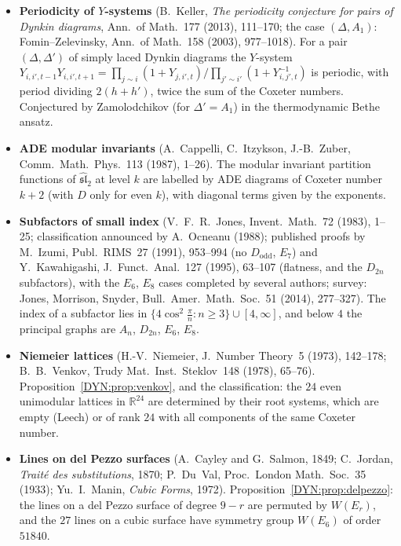 \documentclass[11pt,openany]{book}
\theoremstyle{plain}
\theoremstyle{definition}
\theoremstyle{remark}
\newcommand{\R}{\mathbb{R}}
\begin{document}
\begin{itemize}[leftmargin=1.2em,itemsep=0.45em]
  by the Cartan matrices of finite type; the cluster complex is the dual of a generalized associahedron.
\item \textbf{Periodicity of $Y$-systems} (B.~Keller, \emph{The periodicity conjecture for pairs of Dynkin
  diagrams}, Ann.\ of Math.~177 (2013), 111--170; the case $(\Delta,A_1)$: Fomin--Zelevinsky, Ann.\ of
  Math.~158 (2003), 977--1018). For a pair $(\Delta,\Delta')$ of simply laced Dynkin diagrams the
  $Y$-system
  $Y_{i,i',t-1}Y_{i,i',t+1}=\prod_{j\sim i}(1+Y_{j,i',t})\big/\prod_{j'\sim i'}(1+Y_{i,j',t}^{-1})$ is periodic,
  with period dividing $2(h+h')$, twice the sum of the Coxeter numbers. Conjectured by Zamolodchikov
  (for $\Delta'=A_1$) in the thermodynamic Bethe ansatz.
\item \textbf{ADE modular invariants} (A.~Cappelli, C.~Itzykson, J.-B.~Zuber, Comm.\ Math.\ Phys.~113
  (1987), 1--26). The modular invariant partition functions of $\widehat{\mathfrak{sl}}_2$ at level $k$ are
  labelled by ADE diagrams of Coxeter number $k+2$ (with $D$ only for even $k$), with diagonal terms given
  by the exponents.
\item \textbf{Subfactors of small index} (V.~F.~R.~Jones, Invent.\ Math.~72 (1983), 1--25; classification
  announced by A.~Ocneanu (1988); published proofs by M.~Izumi, Publ.\ RIMS~27 (1991), 953--994
  (no $D_{\mathrm{odd}}$, $E_7$) and Y.~Kawahigashi, J.\ Funct.\ Anal.~127 (1995), 63--107 (flatness, and
  the $D_{2n}$ subfactors), with the $E_6$, $E_8$ cases completed by several authors; survey: Jones, Morrison, Snyder, Bull.\ Amer.\
  Math.\ Soc.~51 (2014), 277--327). The index of a subfactor lies in
  $\{4\cos^2\frac\pi n:n\ge3\}\cup[4,\infty]$, and below $4$ the principal graphs are $A_n$, $D_{2n}$,
  $E_6$, $E_8$.
\item \textbf{Niemeier lattices} (H.-V.~Niemeier, J.\ Number Theory~5 (1973), 142--178; B.~B.~Venkov,
  Trudy Mat.\ Inst.\ Steklov~148 (1978), 65--76). Proposition~\ref{DYN:prop:venkov}, and the
  classification: the $24$ even unimodular lattices in $\R^{24}$ are determined by their root systems,
  which are empty (Leech) or of rank $24$ with all components of the same Coxeter number.
\item \textbf{Lines on del Pezzo surfaces} (A.~Cayley and G.~Salmon, 1849; C.~Jordan, \emph{Trait\'e des
  substitutions}, 1870; P.~Du~Val, Proc.\ London Math.\ Soc.~35 (1933); Yu.~I.~Manin, \emph{Cubic Forms},
  1972). Proposition~\ref{DYN:prop:delpezzo}: the lines on a del Pezzo surface of degree $9-r$ are permuted
  by $W(E_r)$, and the $27$ lines on a cubic surface have symmetry group $W(E_6)$ of order $51840$.
\end{itemize}
\end{document}
